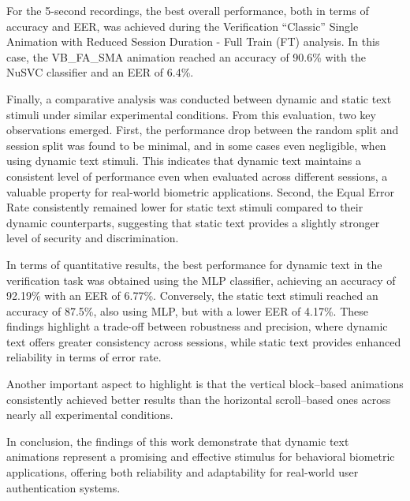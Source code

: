 \documentclass[12pt]{report}
\begin{document}
For the 5-second recordings, the best overall performance, both in terms of accuracy and EER, was achieved during the Verification “Classic” Single Animation with Reduced Session Duration - Full Train (FT) analysis. 
In this case, the VB\_FA\_SMA animation reached an accuracy of 90.6\% with the NuSVC classifier and an EER of 6.4\%.

Finally, a comparative analysis was conducted between dynamic and static text stimuli under similar experimental conditions.
From this evaluation, two key observations emerged.
First, the performance drop between the random split and session split was found to be minimal, and in some cases even negligible, when using dynamic text stimuli.
This indicates that dynamic text maintains a consistent level of performance even when evaluated across different sessions, a valuable property for real-world biometric applications.
Second, the Equal Error Rate consistently remained lower for static text stimuli compared to their dynamic counterparts, suggesting that static text provides a slightly stronger level of security and discrimination.

In terms of quantitative results, the best performance for dynamic text in the verification task was obtained using the MLP classifier, achieving an accuracy of 92.19\% with an EER of 6.77\%.
Conversely, the static text stimuli reached an accuracy of 87.5\%, also using MLP, but with a lower EER of 4.17\%.
These findings highlight a trade-off between robustness and precision, where dynamic text offers greater consistency across sessions, while static text provides enhanced reliability in terms of error rate.

Another important aspect to highlight is that the vertical block–based animations consistently achieved better results than the horizontal scroll–based ones across nearly all experimental conditions.

In conclusion, the findings of this work demonstrate that dynamic text animations represent a promising and effective stimulus for behavioral biometric applications, offering both reliability and adaptability for real-world user authentication systems.

\newpage
\end{document}
